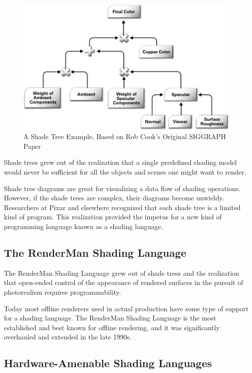\documentclass{book}
\begin{document}
\begin{figure}
    \centering
    \includegraphics[width=1\linewidth]{Images/fig1_12.jpg}
    \caption{A Shade Tree Example, Based on Rob Cook's Original SIGGRAPH Paper}
    \label{fig:1-12}
\end{figure}

Shade trees grew out of the realization that a single predefined shading model would never be sufficient for all the objects and scenes one might want to render.

Shade tree diagrams are great for visualizing a data flow of shading operations. However, if the shade trees are complex, their diagrams become unwieldy. Researchers at Pixar and elsewhere recognized that each shade tree is a limited kind of program. This realization provided the impetus for a new kind of programming language known as a shading language.

\subsection*{The RenderMan Shading Language}

The RenderMan Shading Language grew out of shade trees and the realization that open-ended control of the appearance of rendered surfaces in the pursuit of photorealism requires programmability.

Today most offline renderers used in actual production have some type of support for a shading language. The RenderMan Shading Language is the most established and best known for offline rendering, and it was significantly overhauled and extended in the late 1990s.

\subsection*{Hardware-Amenable Shading Languages}
\end{document}

